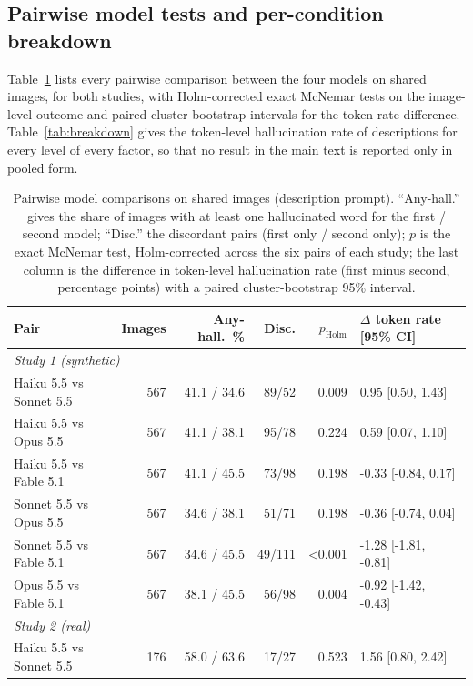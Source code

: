 \documentclass[pdflatex,sn-mathphys-num]{sn-jnl}%
\theoremstyle{thmstyleone}%
\theoremstyle{thmstyletwo}%
\theoremstyle{thmstylethree}%
\begin{document}
\begin{appendices}
\section{Pairwise model tests and per-condition breakdown}\label{secA2}

Table~\ref{tab:pairs} lists every pairwise comparison between the four models on shared images, for both studies, with Holm-corrected exact McNemar tests on the image-level outcome and paired cluster-bootstrap intervals for the token-rate difference. Table~\ref{tab:breakdown} gives the token-level hallucination rate of descriptions for every level of every factor, so that no result in the main text is reported only in pooled form.

\begin{table}[!tbp]
\caption{Pairwise model comparisons on shared images (description prompt). ``Any-hall.'' gives the share of images with at least one hallucinated word for the first / second model; ``Disc.'' the discordant pairs (first only / second only); $p$ is the exact McNemar test, Holm-corrected across the six pairs of each study; the last column is the difference in token-level hallucination rate (first minus second, percentage points) with a paired cluster-bootstrap 95\% interval.}\label{tab:pairs}
\footnotesize
\setlength{\tabcolsep}{3pt}
\begin{tabular*}{\textwidth}{@{\extracolsep\fill}lrrrrl}
\toprule
Pair & Images & Any-hall.\ \% & Disc. & $p_\mathrm{Holm}$ & $\Delta$ token rate [95\% CI] \\
\midrule
\multicolumn{6}{l}{\emph{Study 1 (synthetic)}} \\
Haiku 5.5 vs Sonnet 5.5 & 567 & 41.1 / 34.6 & 89/52 & 0.009 & 0.95 [0.50, 1.43] \\
Haiku 5.5 vs Opus 5.5 & 567 & 41.1 / 38.1 & 95/78 & 0.224 & 0.59 [0.07, 1.10] \\
Haiku 5.5 vs Fable 5.1 & 567 & 41.1 / 45.5 & 73/98 & 0.198 & -0.33 [-0.84, 0.17] \\
Sonnet 5.5 vs Opus 5.5 & 567 & 34.6 / 38.1 & 51/71 & 0.198 & -0.36 [-0.74, 0.04] \\
Sonnet 5.5 vs Fable 5.1 & 567 & 34.6 / 45.5 & 49/111 & <0.001 & -1.28 [-1.81, -0.81] \\
Opus 5.5 vs Fable 5.1 & 567 & 38.1 / 45.5 & 56/98 & 0.004 & -0.92 [-1.42, -0.43] \\
\multicolumn{6}{l}{\emph{Study 2 (real)}} \\
Haiku 5.5 vs Sonnet 5.5 & 176 & 58.0 / 63.6 & 17/27 & 0.523 & 1.56 [0.80, 2.42] \\

\end{tabular*}
\end{table}
\end{appendices}
\end{document}
